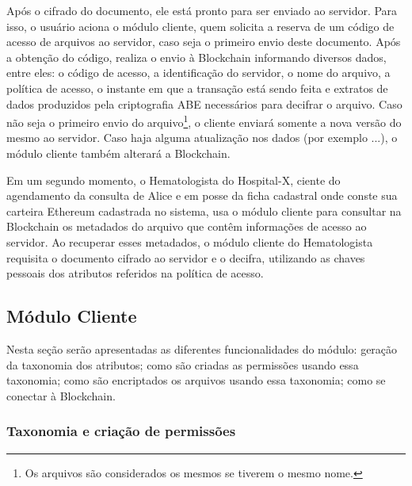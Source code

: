 \documentclass[a4paper,11pt]{article}
\begin{document}
Após o cifrado do documento, ele está pronto para ser enviado ao servidor.
Para isso, o usuário aciona o módulo cliente, quem solicita a reserva de um código de acesso de arquivos ao servidor, caso seja o primeiro envio deste documento.
Após a obtenção do código, realiza o envio à Blockchain informando diversos dados, entre eles: o código de acesso, a identificação do servidor, o nome do arquivo, a política de acesso, o instante em que a transação está sendo feita e extratos de dados produzidos pela criptografia ABE necessários para decifrar o arquivo.
Caso não seja o primeiro envio do arquivo\footnote{Os arquivos são considerados os mesmos se tiverem o mesmo nome.}, o cliente enviará somente a nova versão do mesmo ao servidor.
Caso haja alguma atualização nos dados ({\color{magenta}por exemplo ...}), o módulo cliente também alterará a Blockchain.

Em um segundo momento, o Hematologista do Hospital-X, ciente do agendamento da consulta de Alice e em posse da  ficha cadastral onde conste sua carteira Ethereum cadastrada no sistema, usa o módulo cliente para consultar na Blockchain os metadados do arquivo que contêm informações de acesso ao servidor.
Ao recuperar esses metadados, o módulo cliente do Hematologista requisita o documento cifrado ao servidor e o decifra, utilizando as chaves pessoais dos atributos referidos na política de acesso.

\subsection{Módulo Cliente}

Nesta seção serão apresentadas as diferentes funcionalidades do módulo: geração da taxonomia dos atributos; como são criadas as permissões usando essa taxonomia; como são encriptados os arquivos usando essa taxonomia; como se conectar à Blockchain.

\subsubsection{Taxonomia e criação de permissões}
\label{sec:sub:taxonomia-permissoes}
\end{document}
